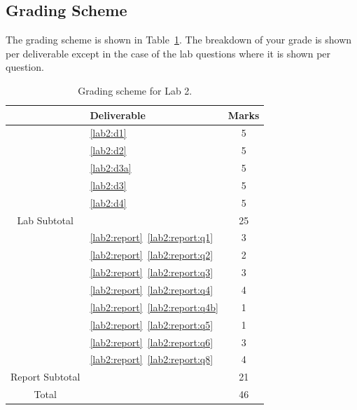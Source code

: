 \subsection{Grading Scheme}
The grading scheme is shown in Table~\ref{tab:lab2:grading}. The breakdown of
your grade is shown per deliverable except in the case of the lab
questions where it is shown per question.
%
\begin{table}
\centering
\begin{tabular}{c|l|c}
        & Deliverable           & Marks  \\ \hline
        & \ref{lab2:d1}         & 5       \\ \hline
        & \ref{lab2:d2}         & 5       \\ \hline
        & \ref{lab2:d3a}        & 5       \\ \hline
        & \ref{lab2:d3}         & 5       \\ \hline
        & \ref{lab2:d4}         & 5       \\ \hhline{=|=|=}
Lab Subtotal&                       & 25      \\ \hhline{=|=|=}
        & \ref{lab2:report}~\ref{lab2:report:q1}  & 3       \\ \hline
        & \ref{lab2:report}~\ref{lab2:report:q2}  & 2       \\ \hline
        & \ref{lab2:report}~\ref{lab2:report:q3}  & 3       \\ \hline
        & \ref{lab2:report}~\ref{lab2:report:q4}  & 4       \\ \hline
        & \ref{lab2:report}~\ref{lab2:report:q4b} & 1       \\ \hline
        & \ref{lab2:report}~\ref{lab2:report:q5}  & 1      \\ \hline
        & \ref{lab2:report}~\ref{lab2:report:q6}  & 3      \\ \hline
        & \ref{lab2:report}~\ref{lab2:report:q8}  & 4       \\ \hhline{=|=|=}
Report Subtotal&  & 21 \\ \hhline{=|=|=}
  Total &                       & 46
\end{tabular}
\caption[Grading Scheme for Lab 2]{Grading scheme for Lab 2.}
\label{tab:lab2:grading}
\end{table}
%
